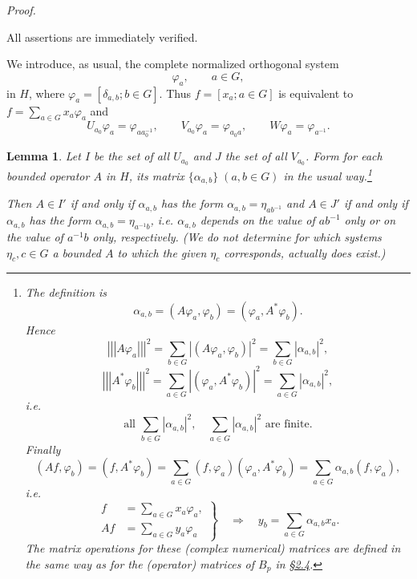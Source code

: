 \documentclass[b5paper,twoside]{article}
\newcommand{\secref}[2]{\hyperref[#1]{\mbox{\S#2}}}
\theoremstyle{mvnplain}
\newtheorem{lemma}{Lemma}[section]
\renewenvironment{proof}[1][Proof]{%
  \par\addvspace{0.35\baselineskip}%
  \noindent\textit{#1.}\ \normalfont\ignorespaces
}{%
  \par\addvspace{0.35\baselineskip}%
}
\newcommand{\Hilbert}{\mathfrak H}
\newcommand{\OpNorm}[1]{\left\lvert\left\lvert\left\lvert#1\right\rvert\right\rvert\right\rvert}
\def\Hilbert{H}%
\def\mathfrak#1{#1}%
\begin{document}
\begin{proof}
All assertions are immediately verified.
\end{proof}

We introduce, as usual, the complete normalized orthogonal system
\begin{equation}\tag{5.3.\(\alpha\)}\label{eq:5.3-alpha}
 \varphi_a,\qquad a\in\mathfrak G,
\end{equation}
in \(\Hilbert\), where
\(\varphi_a=[\delta_{a,b};b\in\mathfrak G]\). Thus
\(f=[x_a;a\in\mathfrak G]\) is equivalent to
\(f=\sum_{a\in\mathfrak G}x_a\varphi_a\) and
\begin{equation}\tag{5.3.\(\beta\)}\label{eq:5.3-beta}
 U_{a_0}\varphi_a=\varphi_{aa_0^{-1}},\qquad
 V_{a_0}\varphi_a=\varphi_{a_0a},\qquad
 W\varphi_a=\varphi_{a^{-1}}.
\end{equation}

\begin{lemma}\label{lem:5.3.2}
Let \(I\) be the set of all \(U_{a_0}\) and \(J\) the set of all
\(V_{a_0}\). Form for each bounded operator \(A\) in \(\Hilbert\), its
matrix \(\{\alpha_{a,b}\}\;(a,b\in\mathfrak G)\) in the usual
way.\footnote{\label{fn:49}The definition is
\[
 \tag{49,\(\alpha\)}\label{eq:49-alpha}
 \alpha_{a,b}=(A\varphi_a,\varphi_b)
              =(\varphi_a,A^*\varphi_b).
\]
Hence
\[
 \OpNorm{A\varphi_a}^{2}
 =\sum_{b\in\mathfrak G}|(A\varphi_a,\varphi_b)|^2
 =\sum_{b\in\mathfrak G}|\alpha_{a,b}|^2,
\]
\[
 \OpNorm{A^*\varphi_b}^{2}
 =\sum_{a\in\mathfrak G}|(\varphi_a,A^*\varphi_b)|^2
 =\sum_{a\in\mathfrak G}|\alpha_{a,b}|^2,
\]
i.e.
\[
 \tag{49,\(\beta\)}\label{eq:49-beta}
 \text{all }\sum_{b\in\mathfrak G}|\alpha_{a,b}|^2,
 \quad\sum_{a\in\mathfrak G}|\alpha_{a,b}|^2\text{ are finite}.
\]
Finally
\[
 (Af,\varphi_b)=(f,A^*\varphi_b)
 =\sum_{a\in\mathfrak G}(f,\varphi_a)(\varphi_a,A^*\varphi_b)
 =\sum_{a\in\mathfrak G}\alpha_{a,b}(f,\varphi_a),
\]
i.e.
\[
 \tag{49,\(\gamma\)}\label{eq:49-gamma}
 \left.
 \begin{aligned}
 f&=\sum_{a\in\mathfrak G}x_a\varphi_a,\\
 Af&=\sum_{a\in\mathfrak G}y_a\varphi_a
 \end{aligned}
 \right\}
 \quad\Longrightarrow\quad
 y_b=\sum_{a\in\mathfrak G}\alpha_{a,b}x_a.
\]
The matrix operations for these (complex numerical) matrices are defined in
the same way as for the (operator) matrices of \(B_p\) in
\secref{sec:2.4}{2.4}.}

Then \(A\in I'\) if and only if \(\alpha_{a,b}\) has the form
\(\alpha_{a,b}=\eta_{ab^{-1}}\) and \(A\in J'\) if and only if
\(\alpha_{a,b}\) has the form \(\alpha_{a,b}=\eta_{a^{-1}b}\), i.e.
\(\alpha_{a,b}\) depends on the value of \(ab^{-1}\) only or on the value of
\(a^{-1}b\) only, respectively. (We do not determine for which systems
\(\eta_c,c\in\mathfrak G\) a bounded \(A\) to which the given \(\eta_c\)
corresponds, actually does exist.)
\end{lemma}
\end{document}

